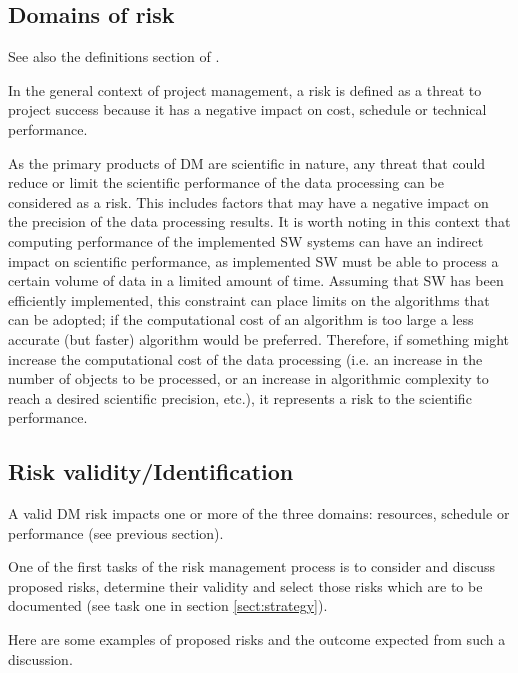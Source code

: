 
\subsection{Domains of risk}
See also the definitions section of .

In the general context of project management, a risk is defined as a threat to project success because it has a negative impact on cost, schedule or technical performance.

As the primary products of DM are scientific in nature, any threat that could reduce or limit the scientific performance of the data processing can be considered as a risk. This includes factors that may have a  negative impact on the precision of the data processing results. It is worth noting in this context that computing performance of the implemented SW systems can have an indirect impact on scientific performance, as implemented SW must be able to process a certain volume of data in a limited amount of time. Assuming that SW has been efficiently implemented, this constraint can place limits on the algorithms that can be adopted; if the computational cost of an algorithm is too large a less accurate (but faster) algorithm would be preferred. Therefore, if something might increase the computational cost of the data processing (i.e. an increase in the number of objects to be processed, or an increase in algorithmic complexity to reach a desired scientific precision, etc.), it represents a risk to the scientific performance.

\subsection{Risk validity/Identification}

A valid DM risk impacts one or more of the three domains: resources, schedule or performance (see previous section).

One of the first tasks of the risk management process is to consider and discuss proposed risks, determine their validity and select those risks which are to be documented (see task one in section \ref{sect:strategy}).

Here are some examples of proposed risks  and the outcome expected from such a discussion.

